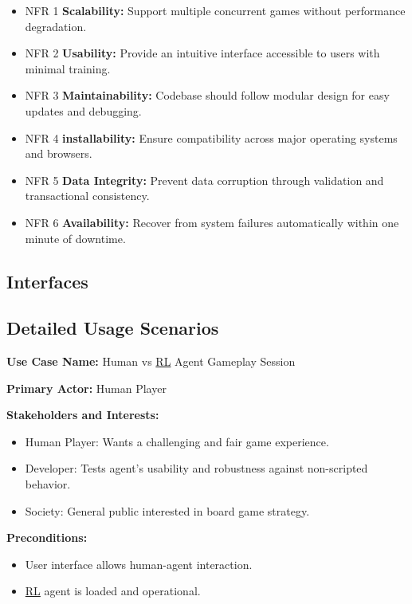 \documentclass{article}
\newcommand{\RL}{\href{https://www.ibm.com/think/topics/reinforcement-learning}{RL}}
\begin{document}
\begin{itemize}
  \item NFR 1 \textbf{Scalability:} Support multiple concurrent games without
        performance degradation.
  \item NFR 2 \textbf{Usability:} Provide an intuitive interface accessible to users
        with minimal training.
  \item NFR 3 \textbf{Maintainability:} Codebase should follow modular design for easy
        updates and debugging.
  \item NFR 4 \textbf{installability:} Ensure compatibility across major operating systems
        and browsers.
  \item NFR 5 \textbf{Data Integrity:} Prevent data corruption through validation and
        transactional consistency.
  \item NFR 6 \textbf{Availability:} Recover from system failures automatically within
        one minute of downtime.
\end{itemize}


\subsection{Interfaces}\label{subsec:interfaces}
\subsection{Detailed Usage Scenarios}\label{subsec:detailed-usage-scenarios}

\noindent\textbf{Use Case Name:} Human vs \RL{} Agent Gameplay Session

\noindent\textbf{Primary Actor:} Human Player

\noindent\textbf{Stakeholders and Interests:}
\begin{itemize}
    \item Human Player: Wants a challenging and fair game experience.
    \item Developer: Tests agent's usability and robustness against non-scripted behavior.
    \item Society: General public interested in board game strategy.
\end{itemize}

\noindent\textbf{Preconditions:}
\begin{itemize}
    \item User interface allows human-agent interaction.
    \item \RL{} agent is loaded and operational.
\end{itemize}
\end{document}
